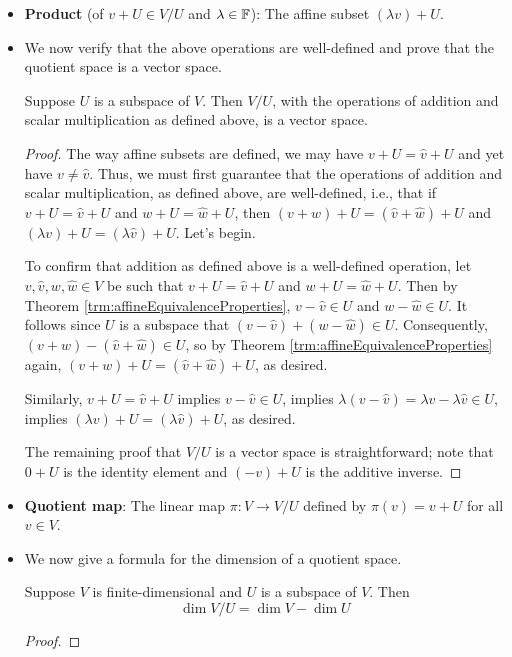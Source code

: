 \documentclass[../main.tex]{subfiles}
\begin{document}
\begin{itemize}
    \item \textbf{Product} (of $v+U\in V/U$ and $\lambda\in\mathbb{F}$): The affine subset $(\lambda v)+U$.
    \item We now verify that the above operations are well-defined and prove that the quotient space is a vector space.
    \begin{theorem}
        Suppose $U$ is a subspace of $V$. Then $V/U$, with the operations of addition and scalar multiplication as defined above, is a vector space.
        \begin{proof}
            The way affine subsets are defined, we may have $v+U=\hat{v}+U$ and yet have $v\neq\hat{v}$. Thus, we must first guarantee that the operations of addition and scalar multiplication, as defined above, are well-defined, i.e., that if $v+U=\hat{v}+U$ and $w+U=\hat{w}+U$, then $(v+w)+U=(\hat{v}+\hat{w})+U$ and $(\lambda v)+U=(\lambda\hat{v})+U$. Let's begin.\par
            To confirm that addition as defined above is a well-defined operation, let $v,\hat{v},w,\hat{w}\in V$ be such that $v+U=\hat{v}+U$ and $w+U=\hat{w}+U$. Then by Theorem \ref{trm:affineEquivalenceProperties}, $v-\hat{v}\in U$ and $w-\hat{w}\in U$. It follows since $U$ is a subspace that $(v-\hat{v})+(w-\hat{w})\in U$. Consequently, $(v+w)-(\hat{v}+\hat{w})\in U$, so by Theorem \ref{trm:affineEquivalenceProperties} again, $(v+w)+U=(\hat{v}+\hat{w})+U$, as desired.\par
            Similarly, $v+U=\hat{v}+U$ implies $v-\hat{v}\in U$, implies $\lambda(v-\hat{v})=\lambda v-\lambda\hat{v}\in U$, implies $(\lambda v)+U=(\lambda\hat{v})+U$, as desired.\par\smallskip
            The remaining proof that $V/U$ is a vector space is straightforward; note that $0+U$ is the identity element and $(-v)+U$ is the additive inverse.
        \end{proof}
    \end{theorem}
    \item \textbf{Quotient map}: The linear map $\pi:V\to V/U$ defined by $\pi(v)=v+U$ for all $v\in V$.
    \item We now give a formula for the dimension of a quotient space.
    \begin{theorem}
        Suppose $V$ is finite-dimensional and $U$ is a subspace of $V$. Then
        \begin{equation*}
            \dim V/U = \dim V-\dim U
        \end{equation*}
        \begin{proof}

\end{proof}
\end{theorem}
\end{itemize}
\end{document}
